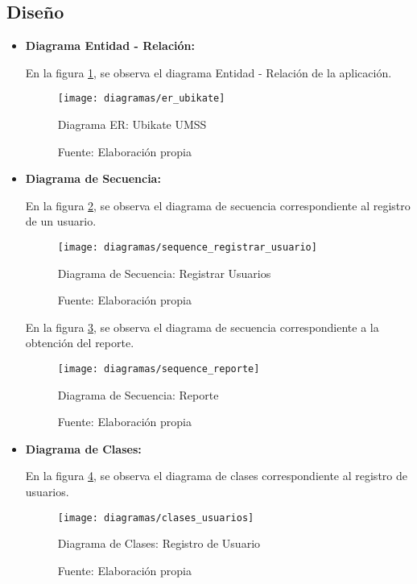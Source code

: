 
\subsection{Diseño}


\begin{itemize}

  \item \textbf{Diagrama Entidad - Relación:}

En la figura \ref{fig:er_ubikate}, se observa el diagrama Entidad - Relación de la aplicación.


\begin{figure}[H]
  \begin{center}
    \texttt{[image: diagramas/er\_ubikate]}
  \end{center}
  \caption{Diagrama ER: Ubikate UMSS}
  \label{fig:er_ubikate}
  \caption*{Fuente: Elaboración propia}
\end{figure}


\item \textbf{Diagrama de Secuencia:}

En la figura \ref{fig:sequence_registrar_usuario}, se observa el diagrama de secuencia correspondiente al registro de un usuario.

\begin{figure}[H]
  \begin{center}
    \texttt{[image: diagramas/sequence\_registrar\_usuario]}
  \end{center}
  \caption{Diagrama de Secuencia: Registrar Usuarios}
  \label{fig:sequence_registrar_usuario}
  \caption*{Fuente: Elaboración propia}
\end{figure}

En la figura \ref{fig:sequence_reporte}, se observa el diagrama de secuencia correspondiente a la obtención del reporte.

\begin{figure}[H]
  \begin{center}
    \texttt{[image: diagramas/sequence\_reporte]}
  \end{center}
  \caption{Diagrama de Secuencia: Reporte}
  \label{fig:sequence_reporte}
  \caption*{Fuente: Elaboración propia}
\end{figure}


\newpage
\item \textbf{Diagrama de Clases:}

En la figura \ref{fig:clases_usuarios}, se observa el diagrama de clases correspondiente al registro de usuarios.

\begin{figure}[H]
\begin{center}
  \texttt{[image: diagramas/clases\_usuarios]}
\end{center}
\caption{Diagrama de Clases: Registro de Usuario}
\label{fig:clases_usuarios}
\caption*{Fuente: Elaboración propia}
\end{figure}


\end{itemize}
